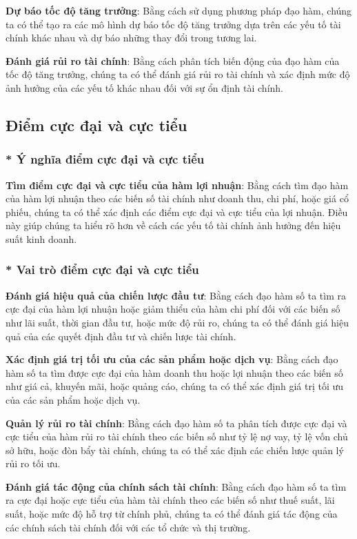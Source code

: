\documentclass[12pt,a4paper]{report}
\begin{document}
\textbf{Dự báo tốc độ tăng trưởng}: Bằng cách sử dụng phương pháp đạo hàm, chúng ta có thể tạo ra các mô hình dự báo tốc độ tăng trưởng dựa trên các yếu tố tài chính khác nhau và dự báo những thay đổi trong tương lai.

\textbf{Đánh giá rủi ro tài chính}: Bằng cách phân tích biến động của đạo hàm của tốc độ tăng trưởng, chúng ta có thể đánh giá rủi ro tài chính và xác định mức độ ảnh hưởng của các yếu tố khác nhau đối với sự ổn định tài chính.
\subsection{Điểm cực đại và cực tiểu}
\subsubsection{* Ý nghĩa điểm cực đại và cực tiểu}
\textbf{Tìm điểm cực đại và cực tiểu của hàm lợi nhuận}: Bằng cách tìm đạo hàm của hàm lợi nhuận theo các biến số tài chính như doanh thu, chi phí, hoặc giá cổ phiếu, chúng ta có thể xác định các điểm cực đại và cực tiểu của lợi nhuận. Điều này giúp chúng ta hiểu rõ hơn về cách các yếu tố tài chính ảnh hưởng đến hiệu suất kinh doanh. 
\subsubsection{* Vai trò điểm cực đại và cực tiểu}
\textbf{Đánh giá hiệu quả của chiến lược đầu tư}: Bằng cách đạo hàm số ta tìm ra cực đại của hàm lợi nhuận hoặc giảm thiểu của hàm chi phí đối với các biến số như lãi suất, thời gian đầu tư, hoặc mức độ rủi ro, chúng ta có thể đánh giá hiệu quả của các quyết định đầu tư và chiến lược tài chính.

\textbf{Xác định giá trị tối ưu của các sản phẩm hoặc dịch vụ}: Bằng cách đạo hàm số ta tìm được cực đại của hàm doanh thu hoặc lợi nhuận theo các biến số như giá cả, khuyến mãi, hoặc quảng cáo, chúng ta có thể xác định giá trị tối ưu của các sản phẩm hoặc dịch vụ.

\textbf{Quản lý rủi ro tài chính}: Bằng cách đạo hàm số ta phân tích được cực đại và cực tiểu của hàm rủi ro tài chính theo các biến số như tỷ lệ nợ vay, tỷ lệ vốn chủ sở hữu, hoặc đòn bẩy tài chính, chúng ta có thể xác định các chiến lược quản lý rủi ro tối ưu.

\textbf{Đánh giá tác động của chính sách tài chính}: Bằng cách đạo hàm số ta tìm ra cực đại hoặc cực tiểu của hàm tài chính theo các biến số như thuế suất, lãi suất, hoặc mức độ hỗ trợ từ chính phủ, chúng ta có thể đánh giá tác động của các chính sách tài chính đối với các tổ chức và thị trường.
\end{document}
